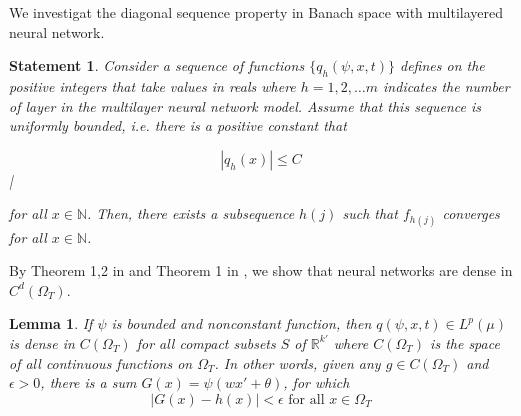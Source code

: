 \documentclass{article}
\newtheorem{statement}{Statement}[section]
\newtheorem{lemma}{Lemma}[section]
\begin{document}
We investigat the diagonal sequence property in Banach space with multilayered neural network. 

\begin{statement}
	Consider a sequence of functions $\{q_{h}(\psi,x,t)\}$ defines on the positive integers that take values in reals where $h = 1,2, \dots m$ indicates the number of layer in the multilayer neural network model. Assume that this sequence is uniformly bounded, i.e. there is a positive constant that 

	\[|q_{h}(x)| \leq C\]|
	
	for all $x \in \mathbb{N}$. Then, there exists a subsequence $h(j)$ such that $f_{h(j)}$ converges for all $x \in  \mathbb{N}$.
\end{statement}
By Theorem 1,2 in \cite{hornik} and Theorem 1 in \cite{cybenko}, we show that neural networks are dense in $C^{d}(\Omega_{T})$.
\begin{lemma}
	If $\psi$ is bounded and nonconstant function, then $q(\psi,x,t)\in L^p(\mu)$ is dense in $C(\Omega_{T})$ for all compact subsets $S$ of $\mathbb{R}^{k'}$ where $C(\Omega_{T})$ is the space of all continuous functions on $\Omega_{T}$. In other words, given any $g \in C(\Omega_{T})$ and $\epsilon > 0$, there is a sum $G(x)=\psi(wx'+\theta)$, for which
	\begin{equation}
	\left|G(x)-h(x)\right| < \epsilon \text{ for all $x\in \Omega_{T}$}
	\end{equation}
	 \label{dense_set}
\end{lemma}
\end{document}
